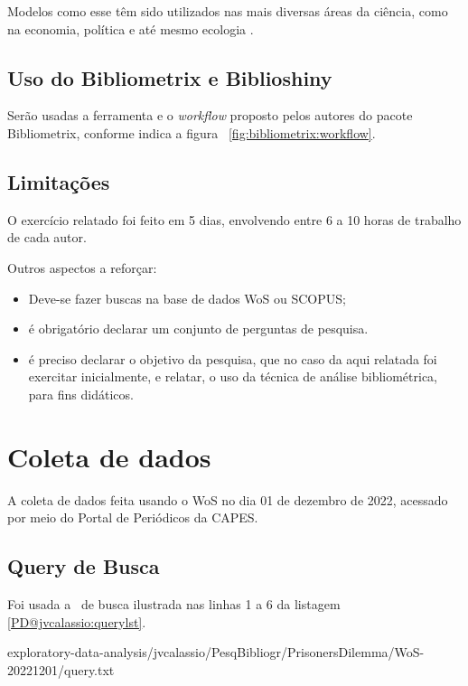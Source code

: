 Modelos como esse têm sido utilizados nas mais diversas áreas da ciência, como na economia, política e até mesmo ecologia \cite{almeida_equilibrio_2012}.

\subsection{Uso do Bibliometrix e Biblioshiny}
Serão usadas a ferramenta e o \textit{workflow} proposto pelos autores do pacote Bibliometrix, conforme indica a figura ~\ref{fig:bibliometrix:workflow}.

\subsection{Limitações} O exercício relatado foi feito em 5 dias, envolvendo entre 6 a 10 horas de trabalho de cada autor.

Outros aspectos a reforçar:
\begin{itemize}
   
\item Deve-se fazer buscas na base de dados WoS ou SCOPUS;
\item é obrigatório declarar um conjunto de perguntas de pesquisa.
\item é preciso declarar o objetivo da pesquisa, que no caso da aqui relatada foi exercitar inicialmente, e relatar, o uso da técnica de análise bibliométrica, para fins didáticos.
\end{itemize}


\section{Coleta de dados\label{PD@jvcalassio:coleta}}

A coleta de dados feita usando o WoS no dia 01 de dezembro de 2022, acessado por meio do Portal de Periódicos da CAPES.

\subsection{Query de Busca}

Foi usada a \query\  de busca ilustrada nas linhas 1 a 6 da listagem \ref{PD@jvcalassio:querylst}.


{exploratory-data-analysis/jvcalassio/PesqBibliogr/PrisonersDilemma/WoS-20221201/query.txt}

